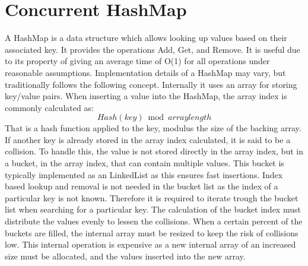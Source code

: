 \section{Concurrent HashMap}\label{app:hashmap}
A HashMap is a data structure which allows looking up values based on their associated key. It provides the operations Add, Get, and Remove. It is useful due to its property of giving an average time of O(1) for all operations under reasonable assumptions\cite[p. 253]{cormen2009introduction}. Implementation details of a HashMap may vary, but traditionally follows the following concept\cite[p. 253]{cormen2009introduction}. Internally it uses an array for storing key/value pairs. When inserting a value into the HashMap, the  array index is commonly calculated as:
\begin{equation}
Hash(key) \bmod arraylength
\end{equation}
That is a hash function applied to the key, modulus the size of the backing array. If another key is already stored in the array index calculated, it is said to be a collision. To handle this, the value is not stored directly in the array index, but in a bucket, in the array index, that can contain multiple values. This bucket is typically implemented as an LinkedList as this ensures fast insertions. Index based lookup and removal is not needed in the bucket list as the index of a particular key is not known. Therefore it is required to iterate trough the bucket list when searching for a particular key. The calculation of the bucket index must distribute the values evenly to lessen the collisions. When a certain percent of the buckets are filled, the internal array must be resized to keep the risk of collisions low. This internal operation is expensive as a new internal array of an increased size must be allocated, and the values inserted into the new array.

